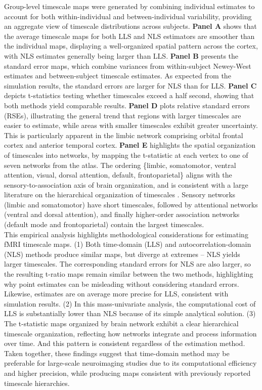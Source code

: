 \documentclass[docs/main.tex]{subfiles}
\begin{document}
Group-level timescale maps were generated by combining individual estimates to account for both within-individual and between-individual variability, providing an aggregate view of timescale distributions across subjects. \textbf{Panel A} shows that the average timescale maps for both LLS and NLS estimators are smoother than the individual maps, displaying a well-organized spatial pattern across the cortex, with NLS estimates generally being larger than LLS. \textbf{Panel B} presents the standard error maps, which combine variances from within-subject Newey-West estimates and between-subject timescale estimates. As expected from the simulation results, the standard errors are larger for NLS than for LLS. \textbf{Panel C} depicts t-statistics testing whether timescales exceed a half second, showing that both methods yield comparable results. \textbf{Panel D} plots relative standard errors (RSEs), illustrating the general trend that regions with larger timescales are easier to estimate, while areas with smaller timescales exhibit greater uncertainty. This is particularly apparent in the limbic network comprising orbital frontal cortex and anterior temporal cortex. \textbf{Panel E} highlights the spatial organization of timescales into networks, by mapping the t-statistic at each vertex to one of seven networks from the \citet{thomas_yeo_organization_2011} atlas. The ordering \{limbic, somatomotor, ventral attention, visual, dorsal attention, default, frontoparietal\} aligns with the sensory-to-association axis of brain organization, and is consistent with a large literature on the hierarchical organization of timescales \citep{murray_hierarchy_2014, hasson_hierarchy_2008, stephens_place_2013, raut_hierarchical_2020, gao_neuronal_2020, hasson_hierarchy_2008}. Sensory networks (limbic and somatomotor) have short timescales, followed by attentional networks (ventral and dorsal attention), and finally higher-order association networks (default mode and frontoparietal) contain the largest timescales.\\

This empirical analysis highlights methodological considerations for estimating fMRI timescale maps. (1) Both time-domain (LLS) and autocorrelation-domain (NLS) methods produce similar maps, but diverge at extremes -- NLS yields larger timescales. The corresponding standard errors for NLS are also larger, so the resulting t-ratio maps remain similar between the two methods, highlighting why point estimates can be misleading without considering standard errors.  Likewise, estimates are on average more precise for LLS, consistent with simulation results.  (2) In this mass-univariate analysis, the computational cost of LLS is substantially lower than NLS because of its simple analytical solution. (3) The t-statistic maps organized by brain network exhibit a clear hierarchical timescale organization, reflecting how networks integrate and process information over time. And this pattern is consistent regardless of the estimation method. Taken together, these findings suggest that time-domain method may be preferable for large-scale neuroimaging studies due to its computational efficiency and higher precision, while producing maps consistent with previously reported timescale hierarchies.
\end{document}
